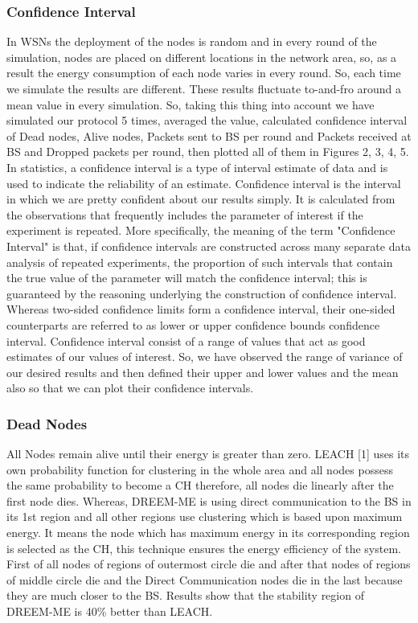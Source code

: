 \documentclass[journal]{IEEEtran}
\begin{document}
\subsubsection{ Confidence Interval }
In WSNs the deployment of the nodes is random and in every round of the simulation, nodes are placed on different locations in the network area, so, as a result the energy consumption of each node varies in every round. So, each time we simulate the results are different. These results fluctuate to-and-fro around a mean value in every simulation. So, taking this thing into account we have simulated our protocol 5 times, averaged the value, calculated confidence interval of Dead nodes, Alive nodes, Packets sent to BS per round and Packets received at BS and Dropped packets per round, then plotted all of them in Figures 2, 3, 4, 5. In statistics, a confidence interval is a type of interval estimate of data and is used to indicate the reliability of an estimate. Confidence interval is the interval in which we are pretty confident about our results simply. It is calculated from the observations that frequently includes the parameter of interest if the experiment is repeated. More specifically, the meaning of the term "Confidence Interval" is that, if confidence intervals are constructed across many separate data analysis of repeated experiments, the proportion of such intervals that contain the true value of the parameter will match the confidence interval; this is guaranteed by the reasoning underlying the construction of confidence interval. Whereas two-sided confidence limits form a confidence interval, their one-sided counterparts are referred to as lower or upper confidence bounds confidence interval. Confidence interval consist of a range of values that act as good estimates of our values of interest. So, we have observed the range of variance of our desired results and then defined their upper and lower values and the mean also so that we can plot their confidence intervals.


\subsubsection{ Dead Nodes }

All Nodes remain alive until their energy is greater than zero. LEACH [1] uses its own probability function for clustering in the whole area and all nodes possess the same probability to become a CH therefore, all nodes die linearly after the first node dies. Whereas, DREEM-ME is using direct communication to the BS in its 1st region and all other regions use clustering which is based upon maximum energy. It means the node which has maximum energy in its corresponding region is selected as the CH, this technique ensures the energy efficiency of the system. First of all nodes of regions of outermost circle die and after that nodes of regions of middle circle die and the Direct Communication nodes die in the last because they are much closer to the BS. Results show that the stability region of DREEM-ME is 40\% better than LEACH.
\end{document}
